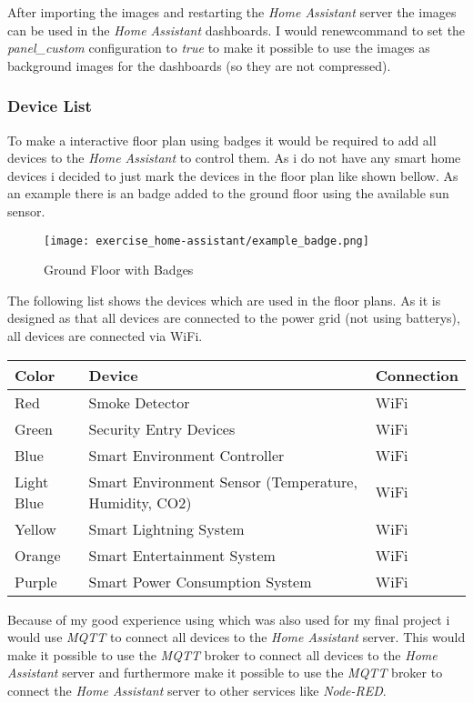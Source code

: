 After importing the images and restarting the \textit{Home Assistant} server the images can be used in the 
\textit{Home Assistant} dashboards. I would renewcommand to set the \textit{panel\_custom} configuration to 
\textit{true} to make it possible to use the images as background images for the dashboards (so they are not compressed).

\subsubsection{Device List}
To make a interactive floor plan using badges it would be required to add all devices to the \textit{Home Assistant} to 
control them. As i do not have any smart home devices i decided to just mark the devices in the floor plan like shown bellow.
As an example there is an badge added to the ground floor using the available sun sensor.

\begin{figure}[H]
    \centering
    \texttt{[image: exercise\_home-assistant/example\_badge.png]}
    \caption{Ground Floor with Badges}
    \label{fig:ground_floor_badges}
\end{figure}

The following list shows the devices which are used in the floor plans.
As it is designed as that all devices are connected to the power grid (not using batterys),  all devices are connected via 
WiFi.

\begin{table}[!ht]
  \centering
  \begin{tabular}{|l|l|l|}
  \hline
      Color & Device & Connection \\ \hline
      Red & Smoke Detector & WiFi \\ \hline
      Green & Security Entry Devices & WiFi \\ \hline
      Blue & Smart Environment Controller & WiFi \\ \hline
      Light Blue & Smart Environment Sensor (Temperature, Humidity, CO2) & WiFi \\ \hline
      Yellow & Smart Lightning System & WiFi \\ \hline
      Orange & Smart Entertainment System & WiFi \\ \hline
      Purple & Smart Power Consumption System & WiFi \\ \hline
  \end{tabular}
\end{table}

Because of my good experience using  which was also used for my final project i would use \textit{MQTT} to 
connect all devices to the \textit{Home Assistant} server. This would make it possible to use the \textit{MQTT} broker 
to connect all devices to the \textit{Home Assistant} server and furthermore make it possible to use the \textit{MQTT} 
broker to connect the \textit{Home Assistant} server to other services like \textit{Node-RED}.

